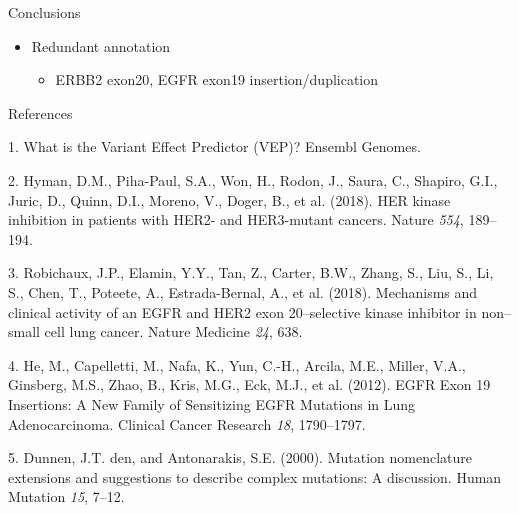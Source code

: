 \documentclass[
  ignorenonframetext,
]{beamer}
\providecommand{\tightlist}{%
  \setlength{\itemsep}{0pt}\setlength{\parskip}{0pt}}
\begin{document}
\begin{frame}{Conclusions}
\protect\hypertarget{conclusions}{}

\begin{itemize}
\tightlist
\item
  Redundant annotation

  \begin{itemize}
  \tightlist
  \item
    ERBB2 exon20, EGFR exon19 insertion/duplication
  \end{itemize}
\end{itemize}

\end{frame}

\begin{frame}[allowframebreaks]{References}
\protect\hypertarget{references}{}

\hypertarget{refs}{}
\leavevmode\hypertarget{ref-__what_}{}%
1. What is the Variant Effect Predictor (VEP)? \textbar{} Ensembl
Genomes.

\leavevmode\hypertarget{ref-hyman_2018_her_nature}{}%
2. Hyman, D.M., Piha-Paul, S.A., Won, H., Rodon, J., Saura, C., Shapiro,
G.I., Juric, D., Quinn, D.I., Moreno, V., Doger, B., et al. (2018). HER
kinase inhibition in patients with HER2- and HER3-mutant cancers. Nature
\emph{554}, 189--194.

\leavevmode\hypertarget{ref-robichaux_2018_mechanisms_natmed}{}%
3. Robichaux, J.P., Elamin, Y.Y., Tan, Z., Carter, B.W., Zhang, S., Liu,
S., Li, S., Chen, T., Poteete, A., Estrada-Bernal, A., et al. (2018).
Mechanisms and clinical activity of an EGFR and HER2 exon 20--selective
kinase inhibitor in non--small cell lung cancer. Nature Medicine
\emph{24}, 638.

\leavevmode\hypertarget{ref-he_2012_egfr_clinicalcancerresearch}{}%
4. He, M., Capelletti, M., Nafa, K., Yun, C.-H., Arcila, M.E., Miller,
V.A., Ginsberg, M.S., Zhao, B., Kris, M.G., Eck, M.J., et al. (2012).
EGFR Exon 19 Insertions: A New Family of Sensitizing EGFR Mutations in
Lung Adenocarcinoma. Clinical Cancer Research \emph{18}, 1790--1797.

\leavevmode\hypertarget{ref-dunnen_2000_mutation_hummutat}{}%
5. Dunnen, J.T. den, and Antonarakis, S.E. (2000). Mutation nomenclature
extensions and suggestions to describe complex mutations: A discussion.
Human Mutation \emph{15}, 7--12.

\end{frame}
\end{document}
